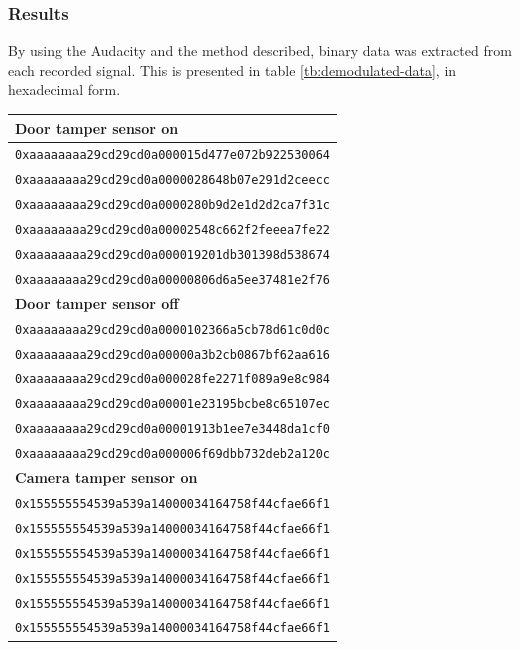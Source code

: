 \subsubsection{Results}
By using the Audacity and the method described, binary data was extracted from each recorded signal. This is presented in table \ref{tb:demodulated-data}, in hexadecimal form.
\begin{table}[!ht]
    \centering
    \begin{tabularx}{\textwidth}{l}
        \hline
        \textbf{Door tamper sensor on} \\ \hline
        \texttt{0xaaaaaaaa29cd29cd0a000015d477e072b922530064} \\
        \texttt{0xaaaaaaaa29cd29cd0a0000028648b07e291d2ceecc} \\
        \texttt{0xaaaaaaaa29cd29cd0a0000280b9d2e1d2d2ca7f31c} \\
        \texttt{0xaaaaaaaa29cd29cd0a00002548c662f2feeea7fe22} \\
        \texttt{0xaaaaaaaa29cd29cd0a000019201db301398d538674} \\
        \texttt{0xaaaaaaaa29cd29cd0a00000806d6a5ee37481e2f76} \\
        \hline
        
        \textbf{Door tamper sensor off} \\ \hline
        \texttt{0xaaaaaaaa29cd29cd0a0000102366a5cb78d61c0d0c} \\
        \texttt{0xaaaaaaaa29cd29cd0a00000a3b2cb0867bf62aa616} \\
        \texttt{0xaaaaaaaa29cd29cd0a000028fe2271f089a9e8c984} \\
        \texttt{0xaaaaaaaa29cd29cd0a00001e23195bcbe8c65107ec} \\
        \texttt{0xaaaaaaaa29cd29cd0a00001913b1ee7e3448da1cf0} \\
        \texttt{0xaaaaaaaa29cd29cd0a000006f69dbb732deb2a120c} \\
        \hline
        
        \textbf{Camera tamper sensor on} \\ \hline
        \texttt{0x155555554539a539a14000034164758f44cfae66f1} \\
        \texttt{0x155555554539a539a14000034164758f44cfae66f1} \\
        \texttt{0x155555554539a539a14000034164758f44cfae66f1} \\
        \texttt{0x155555554539a539a14000034164758f44cfae66f1} \\
        \texttt{0x155555554539a539a14000034164758f44cfae66f1} \\
        \texttt{0x155555554539a539a14000034164758f44cfae66f1} \\
        \hline
        

\end{tabularx}
\end{table}
